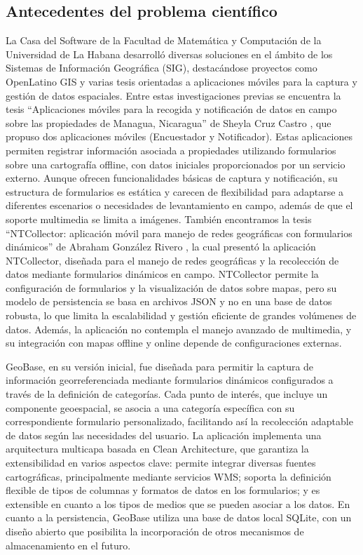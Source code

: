\documentclass{article}
\begin{document}
\subsection{Antecedentes del problema
científico}\label{antecedentes-del-problema-cientuxedfico}
La Casa del Software de la Facultad de Matemática y Computación de la Universidad de La Habana desarrolló diversas soluciones en el ámbito de los Sistemas de Información Geográfica (SIG), destacándose proyectos como OpenLatino GIS y varias tesis orientadas a aplicaciones móviles para la captura y gestión de datos espaciales. Entre estas investigaciones previas se encuentra la tesis ``Aplicaciones móviles  para la recogida y notificación de datos en campo sobre las propiedades de Managua, Nicaragua'' de Sheyla Cruz Castro \cite{castro2018}, que propuso dos aplicaciones móviles (Encuestador y Notificador). Estas aplicaciones permiten registrar información asociada a propiedades utilizando formularios sobre una cartografía offline, con datos iniciales proporcionados por un servicio externo. Aunque ofrecen funcionalidades básicas de captura y notificación, su estructura de formularios es estática y carecen de flexibilidad para adaptarse a diferentes escenarios o necesidades de levantamiento en campo, además de que el soporte multimedia se limita a imágenes. También encontramos la tesis ``NTCollector: aplicación móvil para manejo de redes geográficas con formularios dinámicos'' de Abraham González Rivero \cite{rivero2019}, la cual presentó la aplicación NTCollector, diseñada para el manejo de redes geográficas y la recolección de datos mediante formularios dinámicos en campo. NTCollector permite la configuración de formularios y la visualización de datos sobre mapas, pero su modelo de persistencia se basa en archivos JSON y no en una base de datos robusta, lo que limita la escalabilidad y gestión eficiente de grandes volúmenes de datos. Además, la aplicación no contempla el manejo avanzado de multimedia, y su integración con mapas offline y online depende de configuraciones externas.

GeoBase, en su versión inicial, fue diseñada para permitir la captura de información georreferenciada mediante formularios dinámicos configurados a través de la definición de categorías. Cada punto de interés, que incluye un componente geoespacial, se asocia a una categoría específica con su correspondiente formulario personalizado, facilitando así la recolección adaptable de datos según las necesidades del usuario. La aplicación implementa una arquitectura multicapa basada en Clean Architecture, que garantiza la extensibilidad en varios aspectos clave: permite integrar diversas fuentes cartográficas, principalmente mediante servicios WMS; soporta la definición flexible de tipos de columnas y formatos de datos en los formularios; y es extensible en cuanto a los tipos de medios que se pueden asociar a los datos. En cuanto a la persistencia, GeoBase utiliza una base de datos local SQLite, con un diseño abierto que posibilita la incorporación de otros mecanismos de almacenamiento en el futuro.
\end{document}
